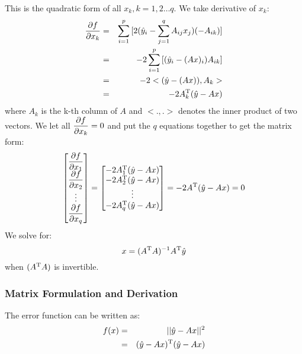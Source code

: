 This is the quadratic form of all $x_k, k=1,2 \ldots q$. We take 
derivative of $x_k$:
\begin{eqnarray}
	\dfrac{\partial f}{\partial x_k} 
	&=& \sum_{i=1}^{p}
		{[2(\hat{y}_i - \sum_{j=1}^{q}{A_{ij}x_j} )
		(- A_{ik})]} \\
	&=& -2 \sum_{i=1}^{p}
		{[(\hat{y}_i - (Ax)_i )
		A_{ik}]} \\
	&=& -2 <(\hat{y} - (Ax)), A_{k}> \\
	&=& -2 A_k^\mathrm{T}(\hat{y} - Ax)
\end{eqnarray}
where $A_k$ is the k-th column of $A$ and $<.,.>$ denotes the inner product 
of two vectors. 
We let all $\dfrac{\partial f}{\partial x_k} = 0$ and put the $q$ equations together
to get the matrix form:
\begin{equation}
	\left[
	\begin{matrix}
		\dfrac{\partial f}{\partial x_1} \\
		\dfrac{\partial f}{\partial x_2} \\
		\vdots \\
		\dfrac{\partial f}{\partial x_q}
	\end{matrix}
	\right]
	=\left[
	\begin{matrix}
		-2 A_1^\mathrm{T}(\hat{y} - Ax) \\
		-2 A_2^\mathrm{T}(\hat{y} - Ax) \\
		\vdots \\
		-2 A_q^\mathrm{T}(\hat{y} - Ax)
	\end{matrix}
	\right]
	= -2 A^\mathrm{T}(\hat{y} - Ax) = 0 
\end{equation}
We solve for:
\begin{equation}
	x = (A^\mathrm{T}A)^{-1}A^\mathrm{T}\hat{y}
\end{equation}
when $(A^\mathrm{T}A)$ is invertible. 


\subsubsection{Matrix Formulation and Derivation}

The error function can be written as:
\begin{eqnarray}
	f(x) &=& ||\hat{y} - Ax||^2 \\
	&=& (\hat{y} - Ax)^\mathrm{T}(\hat{y} - Ax) 
\end{eqnarray}

